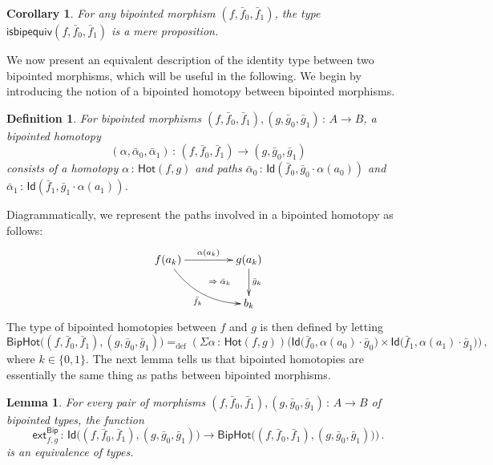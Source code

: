 \documentclass[10pt,a4paper,oneside,reqno]{amsart}
\numberwithin{equation}{section}
\theoremstyle{mythm}
\newtheorem{lemma}[theorem]{Lemma}
\newtheorem{corollary}[theorem]{Corollary}
\theoremstyle{mydef}
\newtheorem{definition}[theorem]{Definition}
\theoremstyle{myrmk}
\newcommand{\defeq}{=_{\mathrm{def}}}
\newcommand{\co}{\,{:}\,}
\newcommand{\ct}{\cdot}
\newcommand{\Hot}{\mathsf{Hot}}
\newcommand{\ext}{\mathsf{ext}}
\newcommand{\Id}{\mathsf{Id}}
\newcommand{\Bip}{\mathsf{Bip}}
\newcommand{\BipHot}{\mathsf{BipHot}}
\newcommand{\isbipequiv}{\mathsf{isbipequiv}}
\begin{document}
\begin{corollary} For any bipointed morphism $(f, \bar{f}_0, \bar{f}_1)$, the type $\isbipequiv(f, \bar{f}_0, \bar{f}_1)$ is a mere proposition.
\end{corollary} 

We now present an equivalent description of the identity type between two bipointed morphisms, which 
will be useful in the following. We begin by introducing the notion of a bipointed homotopy between bipointed morphisms.





\begin{definition} \label{thm:biphomotopy} For bipointed morphisms $(f, \bar{f}_0, \bar{f}_1) , (g, \bar{g}_0, \bar{g}_1) \co A \to B$, 
a \emph{bipointed homotopy} 
\[
(\alpha, \bar{\alpha}_0, \bar{\alpha}_1) \co (f, \bar{f}_0, \bar{f}_1) \to  (g, \bar{g}_0, \bar{g}_1)
\] 
consists of a homotopy $\alpha \co  \Hot(f, g)$ and paths
$\bar{\alpha}_0 \co \Id(  \bar{f}_0 ,  \bar{g}_0 \ct \alpha(a_0)  )$ and $\bar{\alpha}_1 \co \Id(
\bar{f}_1 , \bar{g}_1 \ct  \alpha(a_1))$. 
\end{definition}

Diagrammatically, we represent the paths  involved in a bipointed homotopy as follows:
\[
\xymatrix@C=1.5cm{
f(a_k) \ar[r]^{\alpha(a_k)}  \ar@/_1pc/[dr]_{\bar{f}_k}  
\ar@{}[dr]|{\qquad \Rightarrow \; \bar{\alpha}_k}  & g(a_k) \ar[d]^{\bar{g}_k}  \\ 
 & b_k }
  \] 
The type of bipointed homotopies between $f$ and $g$ is then defined by letting
\[
 \BipHot  \big( (f,\bar{f}_0, \bar{f}_1), (g, \bar{g}_0, \bar{g}_1) \big)   \defeq   
 (\Sigma \alpha \co \Hot( f , g)) \big( 
  \Id\big( \bar{f}_0 ,  \alpha(a_0)  \ct \bar{g}_0 \big) \times 
  \Id \big( \bar{f}_1,  \alpha(a_1) \ct  \bar{g}_1 \big) \big) \, ,
\]
where $k \in \{ 0, 1\}$. The next lemma tells us that bipointed homotopies are essentially the
same thing as paths between bipointed morphisms.


\begin{lemma} \label{BoolHomSpace} 
For every  pair of morphisms $(f, \bar{f}_0, \bar{f}_1), (g, \bar{g}_0, \bar{g}_1) \co A \to B$ of bipointed types, the
function 
\[
\ext^{\Bip}_{f,g} \co \Id \big( (f, \bar{f}_0, \bar{f}_1), (g, \bar{g}_0, \bar{g}_1) \big) \to 
\BipHot\big( (f, \bar{f}_0, \bar{f}_1), (g, \bar{g}_0, \bar{g}_1) ) \big) \, .
\]
is an equivalence of types.
\end{lemma}
\end{document}
